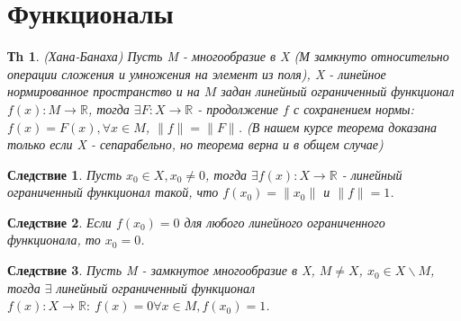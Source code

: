 \documentclass[14pt]{article}
\theoremstyle{plain}
\newtheorem{Thm}{Тh}
\newtheorem{Sled}{Следствие}
\theoremstyle{definition}
\begin{document}
 	\section{Функционалы}
 		\begin{Thm}
 			(Хана-Банаха)\newline
 			Пусть M - многообразие в X (М замкнуто относительно операции сложения и умножения на элемент из поля), X - линейное нормированное пространство и на $M$ задан линейный ограниченный функционал $f(x): M \to \mathbb{R}$, тогда $\exists F: X \to \mathbb{R}$ - продолжение $f$ с сохранением нормы: $f(x) = F(x), \forall x \in M$, $\|f\| = \|F\|$.\newline
 			(В нашем курсе теорема доказана только если X - сепарабельно, но теорема верна и в общем случае)
 		\end{Thm}
 		\begin{Sled}
 			Пусть $x_0 \in X, x_0 \neq 0$, тогда $\exists f(x):X \to \mathbb{R}$ - линейный ограниченный функционал такой, что $f(x_0) = \|x_0\|$ и $\|f\| = 1$. 			
 		\end{Sled}
 		\begin{Sled}
 			Если $f(x_0) = 0$ для любого линейного ограниченного функционала, то $x_0 = 0$.
 		\end{Sled}
 		\begin{Sled}
 			Пусть M - замкнутое многообразие в X, $M \neq X$, $x_0 \in X \backslash M$, тогда $\exists$ линейный ограниченный функционал $f(x): X \to \mathbb{R}: \ f(x) = 0 \forall x \in M, f(x_0) = 1$. 	
 		\end{Sled}
\end{document}
